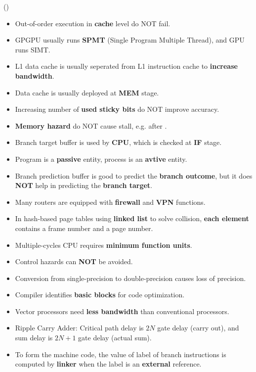 \item \begin{theorem}{()} \quad\quad \begin{itemize}
        \item Out-of-order execution in \textbf{cache} level do NOT fail.
        \item GPGPU usually runs \textbf{SPMT} (Single Program Multiple Thread), and GPU runs SIMT.
        \item L1 data cache is usually seperated from L1 instruction cache to \textbf{increase bandwidth}.
        \item Data cache is usually deployed at \textbf{MEM} stage.
        \item Increasing number of \textbf{used sticky bits} do NOT improve accuracy.
        \item \textbf{Memory hazard} do NOT cause stall, e.g.  after .
        \item Branch target buffer is used by \textbf{CPU}, which is checked at \textbf{IF} stage.
        \item Program is a \textbf{passive} entity, process is an \textbf{avtive} entity.
        \item Branch prediction buffer is good to predict the \textbf{branch outcome}, but it does \textbf{NOT} help in predicting the \textbf{branch target}.
        \item Many routers are equipped with \textbf{firewall} and \textbf{VPN} functions.
        \item In hash-based page tables using \textbf{linked list} to solve collision, \textbf{each element} contains a frame number and a page number.
        \item Multiple-cycles CPU requires \textbf{minimum function units}.
        \item Control hazards can \textbf{NOT} be avoided.
        \item Conversion from single-precision to double-precision causes loss of precision.
        \item Compiler identifies \textbf{basic blocks} for code optimization.
        \item Vector processors need \textbf{less bandwidth} than conventional processors.
        \item Ripple Carry Adder: Critical path delay is $2N$ gate delay (carry out), and sum delay is $2N + 1$ gate delay (actual sum).
        \item To form the machine code, the value of label of branch instructions is computed by \textbf{linker} when the label is an \textbf{external} reference.

\end{itemize}
\end{theorem}
